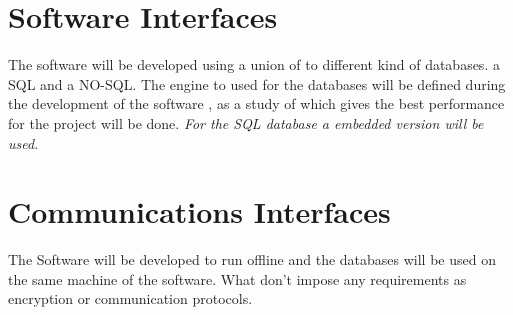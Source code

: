 \documentclass{scrreprt}
\begin{document}

 \section{Software Interfaces}
 The software will be developed using a union of to different kind of databases.
a SQL and a NO-SQL. The engine to used for the databases will be defined during the
development of the software , as a study of which gives the best performance for
the project will be done.
\textit{For the SQL database a embedded version will be used.}

\section{Communications Interfaces}
The Software will be developed to run offline and the databases will be used on
the same machine of the software. What don't impose any requirements as
encryption or communication protocols.
\end{document}

